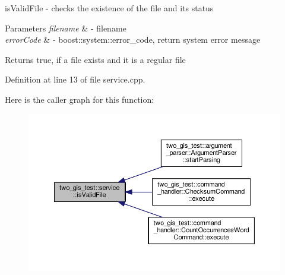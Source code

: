 is\+Valid\+File -\/ checks the existence of the file and its status 


\begin{DoxyParams}{Parameters}
{\em filename} & -\/ filename \\
\hline
{\em error\+Code} & -\/ boost\+::system\+::error\+\_\+code, return system error message \\
\hline
\end{DoxyParams}
\begin{DoxyReturn}{Returns}
true, if a file exists and it is a regular file 
\end{DoxyReturn}


Definition at line 13 of file service.\+cpp.



Here is the caller graph for this function\+:\nopagebreak
\begin{figure}[H]
\begin{center}
\leavevmode
\includegraphics[width=350pt]{namespacetwo__gis__test_1_1service_ae373eed74cdbd1fd23749a7cd25ec61f_icgraph}
\end{center}
\end{figure}


